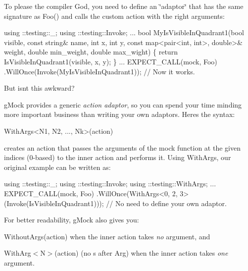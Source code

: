To please the compiler God, you need to define an \char`\"{}adaptor\char`\"{} that has the same signature as {\ttfamily Foo()} and calls the custom action with the right arguments\+:


\begin{DoxyCode}
using ::testing::\_;
using ::testing::Invoke;
...
bool MyIsVisibleInQuadrant1(\textcolor{keywordtype}{bool} visible, \textcolor{keyword}{const} \textcolor{keywordtype}{string}& name, \textcolor{keywordtype}{int} x, \textcolor{keywordtype}{int} y,
                            \textcolor{keyword}{const} map<pair<int, int>, \textcolor{keywordtype}{double}>& weight,
                            \textcolor{keywordtype}{double} min\_weight, \textcolor{keywordtype}{double} max\_wight) \{
  \textcolor{keywordflow}{return} IsVisibleInQuadrant1(visible, x, y);
\}
...
  EXPECT\_CALL(mock, Foo)
      .WillOnce(Invoke(MyIsVisibleInQuadrant1));  \textcolor{comment}{// Now it works.}
\end{DoxyCode}


But isn\textquotesingle{}t this awkward?

g\+Mock provides a generic {\itshape action adaptor}, so you can spend your time minding more important business than writing your own adaptors. Here\textquotesingle{}s the syntax\+:


\begin{DoxyCode}
WithArgs<N1, N2, ..., Nk>(action)
\end{DoxyCode}


creates an action that passes the arguments of the mock function at the given indices (0-\/based) to the inner {\ttfamily action} and performs it. Using {\ttfamily With\+Args}, our original example can be written as\+:


\begin{DoxyCode}
using ::testing::\_;
using ::testing::Invoke;
using ::testing::WithArgs;
...
  EXPECT\_CALL(mock, Foo)
      .WillOnce(WithArgs<0, 2, 3>(Invoke(IsVisibleInQuadrant1)));  \textcolor{comment}{// No need to define your own adaptor.}
\end{DoxyCode}


For better readability, g\+Mock also gives you\+:


\begin{DoxyItemize}
\item {\ttfamily Without\+Args(action)} when the inner {\ttfamily action} takes {\itshape no} argument, and
\item {\ttfamily With\+Arg$<$N$>$(action)} (no {\ttfamily s} after {\ttfamily Arg}) when the inner {\ttfamily action} takes {\itshape one} argument.
\end{DoxyItemize}

